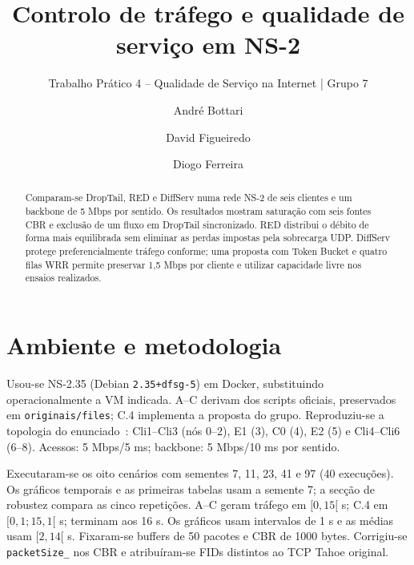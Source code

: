 \documentclass[runningheads]{llncs}
\begin{document}
\renewcommand{\keywordname}{{\bfseries Palavras-chave:}}
\title{Controlo de tráfego e qualidade de serviço em NS-2}
\subtitle{Trabalho Prático 4 -- Qualidade de Serviço na Internet | Grupo 7}

\author{André Bottari \and David Figueiredo \and Diogo Ferreira}
\authorrunning{}
\maketitle



\begin{abstract}
Comparam-se DropTail, RED e DiffServ numa rede NS-2 de seis clientes e um backbone de 5 Mbps por sentido. Os resultados mostram saturação com seis fontes CBR e exclusão de um fluxo em DropTail sincronizado. RED distribui o débito de forma mais equilibrada sem eliminar as perdas impostas pela sobrecarga UDP. DiffServ protege preferencialmente tráfego conforme; uma proposta com Token Bucket e quatro filas WRR permite preservar 1,5 Mbps por cliente e utilizar capacidade livre nos ensaios realizados.
\end{abstract}

\section{Ambiente e metodologia}
Usou-se NS-2.35 (Debian \texttt{2.35+dfsg-5}) em Docker, substituindo operacionalmente a VM indicada. A--C derivam dos scripts oficiais, preservados em \texttt{originais/files}; C.4 implementa a proposta do grupo. Reproduziu-se a topologia do enunciado~\cite{enunciado}: Cli1--Cli3 (nós 0--2), E1 (3), C0 (4), E2 (5) e Cli4--Cli6 (6--8). Acessos: 5 Mbps/5 ms; backbone: 5 Mbps/10 ms por sentido.

Executaram-se os oito cenários com sementes 7, 11, 23, 41 e 97 (40 execuções). Os gráficos temporais e as primeiras tabelas usam a semente 7; a secção de robustez compara as cinco repetições. A--C geram tráfego em $[0,15[$ s; C.4 em $[0,1;15,1[$ s; terminam aos 16 s. Os gráficos usam intervalos de 1 s e as médias usam $[2,14[$ s. Fixaram-se buffers de 50 pacotes e CBR de 1000 bytes. Corrigiu-se \texttt{packetSize\_} nos CBR e atribuíram-se FIDs distintos ao TCP Tahoe original.
\end{document}
